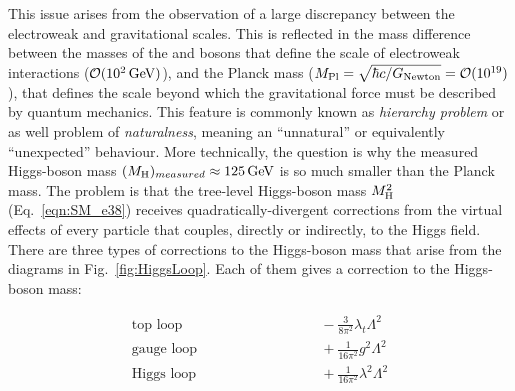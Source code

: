 This issue arises from the observation of a large discrepancy between the electroweak and gravitational scales. This is reflected in the mass difference between the masses of the \PW and \PZ bosons that define the scale of electroweak interactions ($\mathcal{O}(10^2\,\text{Ge\hspace{-.08em}V})$), and the Planck mass ($M_\mathrm{Pl} = \sqrt{\hbar c/G_\mathrm{Newton}} = \mathcal{O}(10^{19})$), that defines the scale beyond which the gravitational force must be described by quantum mechanics. This feature is commonly known as \textit{hierarchy problem} or as well problem of \textit{naturalness}, meaning an ``unnatural'' or equivalently ``unexpected'' behaviour.
More technically, the question is why the measured Higgs-boson mass $(M_\mathrm{H})_{measured} \approx 125\,\text{Ge\hspace{-.08em}V}$ is so much smaller than the Planck mass.
The problem is that the tree-level Higgs-boson mass $M^2_\mathrm{H}$ (Eq.~\ref{eqn:SM_e38}) receives quadratically-divergent corrections from the virtual effects of every particle that couples, directly or indirectly, to the Higgs field.
There are three types of corrections to the Higgs-boson mass that arise from the diagrams in Fig.~\ref{fig:HiggsLoop}.
Each of them gives a correction to the Higgs-boson mass:

\begin{equation}\label{eqn:HiggsCorr}
\begin{aligned}
\mbox{top loop} & \qquad\qquad\qquad\qquad -\frac{3}{8\pi^2}\lambda_t\Lambda^2\\
\mbox{gauge loop} & \qquad\qquad\qquad\qquad + \frac{1}{16\pi^2}g^2\Lambda^2\\
\mbox{Higgs loop} & \qquad\qquad\qquad\qquad + \frac{1}{16\pi^2}\lambda^2\Lambda^2\\
\end{aligned}
\end{equation}

